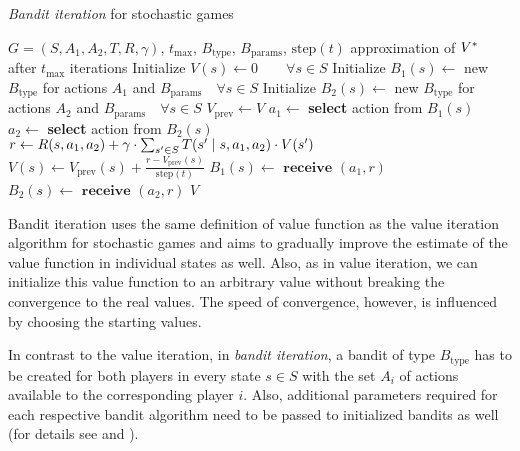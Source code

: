 \documentclass[../main.tex]{subfiles}
\begin{document}
\begin{algorithm}
    \caption{\textit{Bandit iteration} for stochastic games}
    \label{new:bandititeration:alg:alg}
    \begin{algorithmic}[1]
        \Require $G = \left(S, A_1, A_2, T, R, \gamma\right)$, $t_{\text{max}}$, $B_{\text{type}}$, $B_{\text{params}}$, $\text{step}(t)$
        \Ensure approximation of $V^*$ after $t_{\text{max}}$ iterations
        \State Initialize $V(s) \leftarrow 0 \qquad \forall s \in S$
        \State Initialize $B_1(s) \leftarrow$ new $B_{\text{type}}$ for actions $A_1$ and $B_{\text{params}} \quad \forall s \in S$
        \State Initialize $B_2(s) \leftarrow$ new $B_{\text{type}}$ for actions $A_2$ and $B_{\text{params}} \quad \forall s \in S$
            \State $V_{\text{prev}} \leftarrow V$
                \State $a_1 \leftarrow$ \textbf{select} action from $B_1(s)$
                \State $a_2 \leftarrow$ \textbf{select} action from $B_2(s)$
                \Statex
                \State $r \leftarrow R(s, a_1, a_2) + \gamma \cdot \sum_{s^{\prime} \in S} T(s^{\prime} \mid s, a_1, a_2) \cdot V(s^{\prime})$
                \State $V(s) \leftarrow V_{\text{prev}}(s) + \frac{r - V_{\text{prev}}(s)}{\text{step}(t)}$ 
                \Statex
                \State $B_1(s) \leftarrow \textbf{ receive } (a_1, r)$ 
                \State $B_2(s) \leftarrow \textbf{ receive } (a_2, r)$ 
            \EndFor
        \EndFor
        \State\Return $V$
    \end{algorithmic}
\end{algorithm}

Bandit iteration uses the same definition of value function as the value iteration algorithm for stochastic games and aims to gradually improve the estimate of the value function in individual states as well.
Also, as in value iteration, we can initialize this value function to an arbitrary value without breaking the convergence to the real values.
The speed of convergence, however, is influenced by choosing the starting values.

In contrast to the value iteration, in \textit{bandit iteration}, a bandit of type $B_{\text{type}}$ has to be created for both players in every state $s \in S$ with the set $A_i$ of actions available to the corresponding player $i$.
Also, additional parameters required for each respective bandit algorithm need to be passed to initialized bandits as well (for details see  and ).
\end{document}

